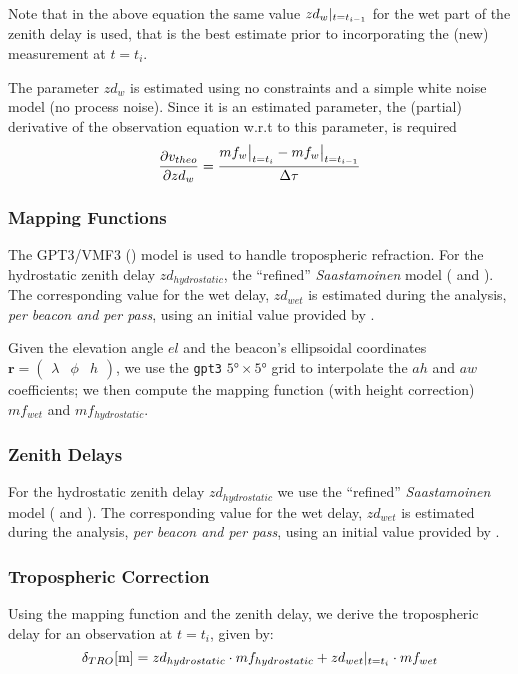 Note that in the above equation the same value $zd_{w}\at{t=t_{i-1}}$ 
for the wet part of the zenith delay is used, that is the best estimate prior to 
incorporating the (new) measurement at $t=t_i$.

The parameter $zd_{w}$ is estimated using no constraints and a simple white 
noise model (no process noise). Since it is an estimated parameter, 
the (partial) derivative of the observation equation w.r.t to this parameter, 
is required
\begin{equation}\label{eq:partials-zwd}
  \frac{\partial v_{theo}}{\partial zd_{w}} = \frac{mf_{w}\at[\big]{t=t_i} 
    - mf_{w}\at[\big]{t=t_{i-1}}}{\Delta \tau}
\end{equation}

\iffalse
\subsubsection{Mapping Functions}
The GPT3/VMF3 (\cite{Landskron2018}) model is used to handle tropospheric refraction. 
For the hydrostatic zenith delay $zd_{hydrostatic}$, the ``refined'' 
\emph{Saastamoinen} model (\cite{Davisetal85} and \cite{Saastamoinen72}). 
The corresponding value for the wet delay, $zd_{wet}$ is estimated during the 
analysis, \emph{per beacon and per pass}, using an initial value provided by 
\cite{Askneetal87}.

Given the elevation angle $el$ and the beacon's ellipsoidal coordinates 
$\bm{r}=\begin{pmatrix} \lambda & \phi & h\end{pmatrix}$, we use the \texttt{gpt3} 
$\ang{5} \times \ang{5}$ grid to interpolate the $ah$ and $aw$ coefficients; 
we then compute the mapping function (with height correction) $mf_{wet}$ and 
$mf_{hydrostatic}$.

\subsubsection{Zenith Delays}
For the hydrostatic zenith delay $zd_{hydrostatic}$ we use the ``refined'' 
\emph{Saastamoinen} model (\cite{Davisetal85} and \cite{Saastamoinen72}). 
The corresponding value for the wet delay, $zd_{wet}$ is estimated during the 
analysis, \emph{per beacon and per pass}, using an initial value provided by 
\cite{Askneetal87}.

\subsubsection{Tropospheric Correction}
Using the mapping function and the zenith delay, we derive the tropospheric 
delay for an observation at $t=t_i$, given by:
\begin{equation}
  \delta _{TRO} [\si{\m}] = zd_{hydrostatic} \cdot mf_{hydrostatic} + zd_{wet}\at{t=t_i} \cdot mf_{wet}
  \label{eq:tropo-delay}
\end{equation}

